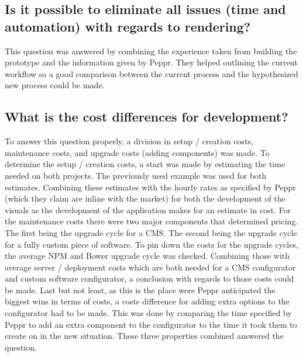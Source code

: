 \subsection{Is it possible to eliminate all issues (time and automation) with regards to rendering?}
This question was answered by combining the experience taken from building the prototype and the information given by Peppr. They helped outlining the current workflow so a good comparison between the current process and the hypothesized new process could be made.

\subsection{What is the cost differences for development?}
To answer this question properly, a division in setup / creation costs, maintenance costs, and upgrade costs (adding components) was made. To determine the setup / creation costs, a start was made by estimating the time needed on both projects. The previously used example was used for both estimates. Combining these estimates with the hourly rates as specified by Peppr (which they claim are inline with the market) for both the development of the visuals as the development of the application makes for an estimate in cost.\newline
For the maintenance costs there were two major components that determined pricing. The first being the upgrade cycle for a CMS. The second being the upgrade cycle for a fully custom piece of software. To pin down the costs for the upgrade cycles, the average NPM and Bower upgrade cycle was checked. Combining those with average server / deployment costs which are both needed for a CMS configurator and custom software configurator, a conclusion with regards to those costs could be made.\newline
Last but not least, as this is the place were Peppr anticipated the biggest wins in terms of costs, a costs difference for adding extra options to the configurator had to be made. This was done by comparing the time specified by Peppr to add an extra component to the configurator to the time it took them to create on in the new situation.\newline
These three properties combined answered the question.

